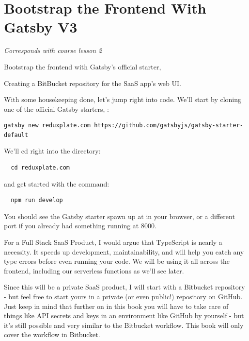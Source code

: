 \documentclass[a4paper,
                             oneside,
                             BCOR1.0cm,
                             DIV11,
                             parskip=full,
                             11pt]{scrbook}
\begin{document}
\section{Bootstrap the Frontend With Gatsby V3}\label{sec:titles}
\textit{Corresponds with course lesson 2}
\begin{arrows}
\item Bootstrap the frontend with Gatsby's official starter, 
\item Creating a BitBucket  repository for the SaaS app's web UI.
\end{arrows}

With some housekeeping done, let's jump right into code. We'll start by cloning one of the official Gatsby starters, :

\begin{verbatim}
gatsby new reduxplate.com https://github.com/gatsbyjs/gatsby-starter-default
\end{verbatim}

We'll cd right into the directory:

\begin{verbatim}
  cd reduxplate.com
  \end{verbatim}

and get started with the  command:

\begin{verbatim}
  npm run develop
  \end{verbatim}

You should see the Gatsby starter spawn up at  in your browser, or a different port if you already had something running at 8000.


For a Full Stack SaaS Product, I would argue that TypeScript is nearly a necessity. It speeds up development, maintainability, and will help you catch any type errors before even running your code. We will be using it all across the frontend, including our serverless functions as we'll see later.

Since this will be a private SaaS product, I will start with a Bitbucket repository - but feel free to start yours in a private (or even public!) repository on GitHub. Just keep in mind that further on in this book you will have to take care of things like API secrets and keys in an environment like GitHub by yourself - but it's still possible and very similar to the Bitbucket workflow. This book will only cover the workflow in Bitbucket.
\end{document}
